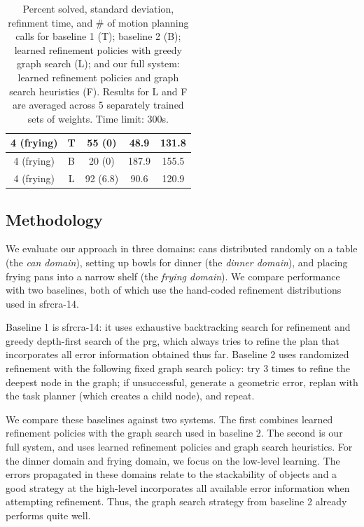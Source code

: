 \begin{table}[t]
{\begin{tabular}{ccccc}
    \midrule[1.5pt]
      4 (frying) & T & 55 (0) & 48.9 & 131.8\\
    \midrule
      4 (frying) & B & 20 (0) & 187.9 & 155.5\\
    \midrule
      4 (frying) & L & 92 (6.8) & 90.6 & 120.9\\
    \bottomrule[1.5pt]
  \end{tabular}}
  \caption{\small{Percent solved, standard deviation, refinment time,
      and \# of motion planning calls for baseline 1 (T); baseline 2
      (B); learned refinement policies with greedy graph search (L);
      and our full system: learned refinement policies and graph
      search heuristics (F). Results for L and F are averaged across 5
      separately trained sets of weights. Time limit: 300s.}}
  \label{table:results}
  \vspace{-1em}
\end{table}

\subsection{Methodology}
We evaluate our approach in three domains: cans distributed randomly
on a table (the \emph{can domain}), setting up bowls for dinner (the
\emph{dinner domain}), and placing frying pans into a narrow shelf
(the \emph{frying domain}).  We compare performance with two
baselines, both of which use the hand-coded refinement distributions
used in {\sc sfrcra-14}.

Baseline 1 is {\sc sfrcra-14}: it uses exhaustive backtracking search
for refinement and greedy depth-first search of the {\sc prg}, which
always tries to refine the plan that incorporates all error
information obtained thus far.  Baseline 2 uses randomized refinement
with the following fixed graph search policy: try 3 times to refine
the deepest node in the graph; if unsuccessful, generate a geometric
error, replan with the task planner (which creates a child node), and
repeat.

We compare these baselines against two systems. The first combines
learned refinement policies with the graph search used in baseline
2. The second is our full system, and uses learned refinement policies
and graph search heuristics.  For the dinner domain and frying domain,
we focus on the low-level learning. The errors propagated in these
domains relate to the stackability of objects and a good strategy at
the high-level incorporates all available error information when
attempting refinement. Thus, the graph search strategy from baseline 2
already performs quite well.


